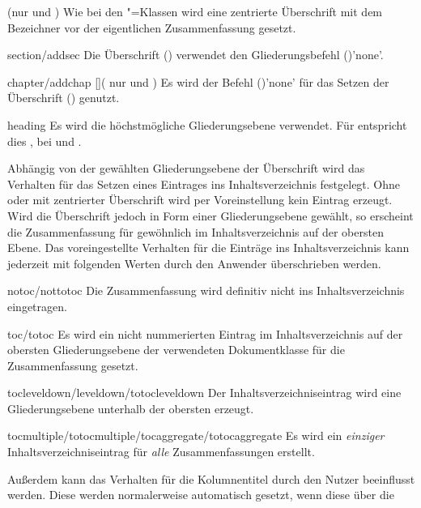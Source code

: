 \begin{Declaration*}{}
\begin{Declaration*}{}
\begin{Declaration*}{}
\begin{Declaration}[%
  v2.02!\Option{abstract=multiple}:ersetzt \Option{abstract=double};%
  v2.02!\Option{abstract=tocleveldown};%
  v2.02!\Option{abstract=markboth};%
  v2.04!\Option{abstract=tocmultiple}%
]{}
\begin{values}{}
\itemtrue*(nur  und )
  Wie bei den \KOMAScript"=Klassen wird eine zentrierte Überschrift mit dem 
  Bezeichner  vor der eigentlichen Zusammenfassung gesetzt.
\item[section/addsec]
  Die Überschrift () verwendet den Gliederungsbefehl 
  ()'none'.
\item[chapter/addchap][\Class{tudscrbook}](%
    nur  und %
  )
  Es wird der Befehl ()'none' für das 
  Setzen der Überschrift () genutzt. 
\item[heading]
  Es wird die höchstmögliche Gliederungsebene verwendet. Für 
   entspricht dies , bei 
   und  .
\end{values}
%
Abhängig von der gewählten Gliederungsebene der Überschrift wird das Verhalten 
für das Setzen eines Eintrages ins Inhaltsverzeichnis festgelegt. Ohne oder mit 
zentrierter Überschrift wird per Voreinstellung kein Eintrag erzeugt. Wird die 
Überschrift jedoch in Form einer Gliederungsebene gewählt, so erscheint die 
Zusammenfassung für gewöhnlich im Inhaltsverzeichnis auf der obersten Ebene. 
Das voreingestellte Verhalten für die Einträge ins Inhaltsverzeichnis kann 
jederzeit mit folgenden Werten durch den Anwender überschrieben werden.
%
\begin{values}{}
\item[notoc/nottotoc]
  Die Zusammenfassung wird definitiv nicht ins Inhaltsverzeichnis eingetragen.
\item[toc/totoc]
  Es wird ein nicht nummerierten Eintrag im Inhaltsverzeichnis auf der obersten 
  Gliederungsebene der verwendeten Dokumentklasse für die Zusammenfassung 
  gesetzt.
\item[tocleveldown/leveldown/totocleveldown]
  Der Inhaltsverzeichniseintrag wird eine Gliederungsebene unterhalb der 
  obersten erzeugt.
\item[tocmultiple/totocmultiple/tocaggregate/totocaggregate]
  Es wird ein \emph{einziger} Inhaltsverzeichniseintrag für \emph{alle} 
  Zusammenfassungen erstellt.
\end{values}
%
Außerdem kann das Verhalten für die Kolumnentitel durch den Nutzer beeinflusst 
werden. Diese werden normalerweise automatisch gesetzt, wenn diese über die 

\end{Declaration}
\end{Declaration*}
\end{Declaration*}
\end{Declaration*}
